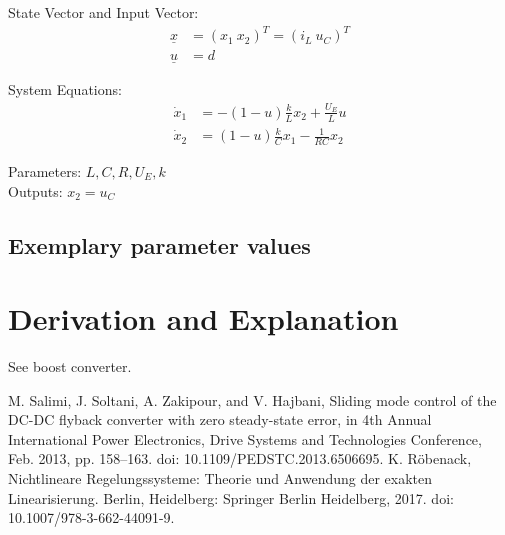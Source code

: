 \documentclass[10pt,a4paper]{article}
\begin{document}
	State Vector and Input Vector:
	\begin{align*}
		\underline{x} &= (x_1 \ x_2)^T = (i_L \ u_C)^T \\
		\underline{u} &= d
	\end{align*}
	
	\noindent System Equations:			
	\begin{subequations}
	\begin{align}
		\dot{x}_1 &= -(1-u)\frac{k}{L}x_2 + \frac{U_E}{L}u \\
		\dot{x}_2 &= (1-u)\frac{k}{C}x_1 - \frac{1}{RC}x_2
	\end{align}
	\end{subequations}

	\noindent
	Parameters: $L, C, R, U_E, k$ %
	\\
	Outputs: $x_2 = u_C$
	
	
	
	
	\subsection{Exemplary parameter values}
	

	
	\section{Derivation and Explanation} %
	See boost converter.
	
	
	\begin{thebibliography}{10}		
		M. Salimi, J. Soltani, A. Zakipour, and V. Hajbani, Sliding mode control of the DC-DC flyback converter with zero steady-state error, in 4th Annual International Power Electronics, Drive Systems and Technologies Conference, Feb. 2013, pp. 158–163. doi: 10.1109/PEDSTC.2013.6506695.
		K. Röbenack, Nichtlineare Regelungssysteme: Theorie und Anwendung der exakten Linearisierung. Berlin, Heidelberg: Springer Berlin Heidelberg, 2017. doi: 10.1007/978-3-662-44091-9.
	\end{thebibliography}
\end{document}
